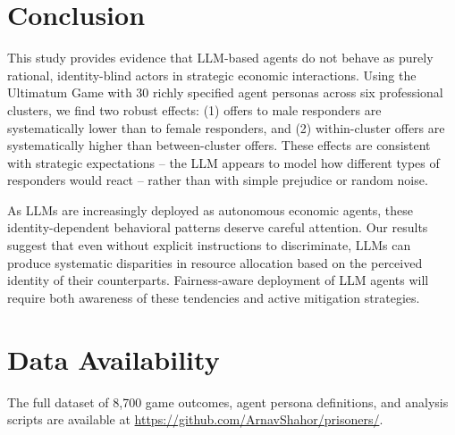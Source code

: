 \documentclass[12pt]{article}
\begin{document}
\section{Conclusion}

This study provides evidence that LLM-based agents do not behave as purely rational, identity-blind actors in strategic economic interactions. Using the Ultimatum Game with 30 richly specified agent personas across six professional clusters, we find two robust effects: (1) offers to male responders are systematically lower than to female responders, and (2) within-cluster offers are systematically higher than between-cluster offers. These effects are consistent with strategic expectations -- the LLM appears to model how different types of responders would react -- rather than with simple prejudice or random noise.

As LLMs are increasingly deployed as autonomous economic agents, these identity-dependent behavioral patterns deserve careful attention. Our results suggest that even without explicit instructions to discriminate, LLMs can produce systematic disparities in resource allocation based on the perceived identity of their counterparts. Fairness-aware deployment of LLM agents will require both awareness of these tendencies and active mitigation strategies.

\section*{Data Availability}

The full dataset of 8,700 game outcomes, agent persona definitions, and analysis scripts are available at \url{https://github.com/ArnavShahor/prisoners/}.
\end{document}
